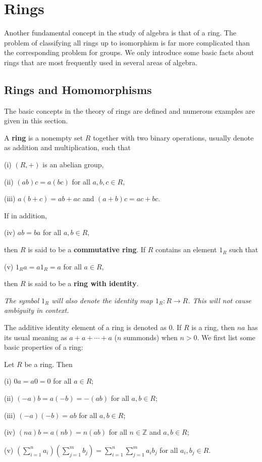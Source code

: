 \section{Rings}
Another fundamental concept in the study of algebra is that of a ring. The problem of classifying all rings up to isomorphism is far more complicated than the corresponding problem for groups. We only introduce some basic facts about rings that are most frequently used in several areas of algebra.
\subsection{Rings and Homomorphisms}
The basic concepts in the theory of rings are defined and numerous examples are given in this section.
\begin{definition}
A \textbf{ring} is a nonempty set $R$ together with two binary operations, usually denote as addition and multiplication, such that\par
(i) $(R,+)$ is an abelian group,\par
(ii) $(ab)c=a(bc)$ for all $a,b,c\in R$,\par
(iii) $a(b+c)=ab+ac$ and $(a+b)c=ac+bc$.\par
If in addition,\par
(iv) $ab=ba$ for all $a,b\in R$,\par
then $R$ is said to be a \textbf{commutative ring}. If $R$ contains an element $1_R$ such that\par
(v) $1_Ra=a1_R=a$ for all $a\in R$,\par
then $R$ is said to be a \textbf{ring with identity}.
\end{definition}
\begin{note}\em
The symbol $1_R$ will also denote the identity map $1_R:R\to R$. This will not cause ambiguity in context.
\end{note}
The additive identity element of a ring is denoted as $0$. If $R$ is a ring, then $na$ has its usual meaning as $a+a+\cdots+a$ ($n$ summonds) when $n>0$. We first list some basic properties of a ring:
\begin{theorem}
Let $R$ be a ring. Then\par
(i) $0a=a0=0$ for all $a\in R$;\par
(ii) $(-a)b=a(-b)=-(ab)$ for all $a,b\in R$;\par
(iii) $(-a)(-b)=ab$ for all $a,b\in R$;\par
(iv) $(na)b=a(nb)=n(ab)$ for all $n\in\mathbb{Z}$ and $a,b\in R$;\par
(v) $\left(\sum_{i=1}^na_i\right)\left(\sum_{j=1}^mb_j\right)=\sum_{i=1}^n\sum_{j=1}^ma_ib_j$ for all $a_i,b_j\in R$.
\end{theorem}
